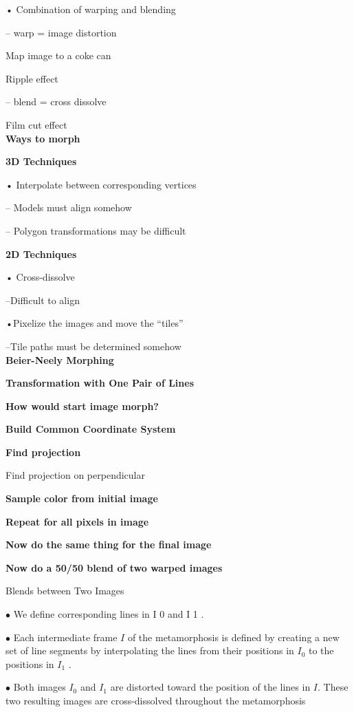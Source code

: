 \documentclass[]{report}
\begin{document}
• Combination of warping and blending

– warp = image distortion

 Map image to a coke can

 Ripple effect

– blend = cross dissolve

 Film cut effect\\
\textbf{Ways to morph}

\textbf{3D Techniques}

• Interpolate between corresponding vertices

– Models must align somehow

– Polygon transformations may be difficult

\textbf{2D Techniques}

• Cross-dissolve

–Difficult to align

•Pixelize the images and move the “tiles”

–Tile paths must be determined somehow\\
\textbf{Beier-Neely Morphing}

\textbf{Transformation with One Pair of Lines}

\textbf{How would start image morph?}

\textbf{Build Common Coordinate System}

\textbf{Find projection}

Find projection on perpendicular

\textbf{Sample color from initial image}

\textbf{Repeat for all pixels in image}

\textbf{Now do the same thing for the final image}

\textbf{Now do a 50/50 blend of two warped
images}

Blends between Two Images

$\bullet$ We define corresponding lines in I 0 and I 1 .

$\bullet$ Each intermediate frame $I$ of the metamorphosis is
defined by creating a new set of line segments by
interpolating the lines from their positions in $I_0$ to the
positions in $I_1$ .

$\bullet$ Both images $I_0$ and $I_1$ are distorted toward the position
of the lines in $I$. These two resulting images are
cross-dissolved throughout the metamorphosis
\end{document}
